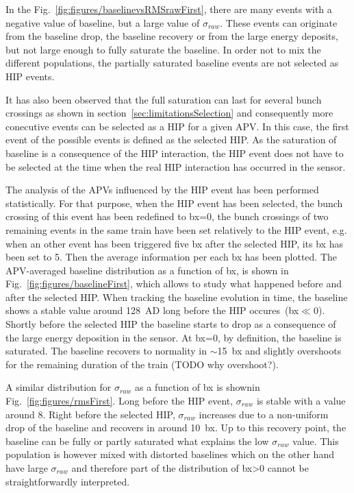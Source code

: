 In the Fig.~\ref{fig:figures/baselinevsRMSrawFirst}, there are many events with a negative value of baseline, but a large value of $\sigma_{raw}$. These events can originate from the baseline drop, the baseline recovery or from the large energy deposits, but not large enough to fully saturate the baseline. In order not to mix the different populations, the partially saturated baseline events are not selected as HIP events. 

It has also been observed that the full saturation can last for several bunch crossings as shown in section~\ref{sec:limitationsSelection} and consequently more conecutive events can be selected as a HIP for a given APV. In this case, the first event of the possible events is defined as the selected HIP. As the saturation of baseline is a consequence of the HIP interaction, the HIP event does not have to be selected at the time when the real HIP interaction has occurred in the sensor. 


The analysis of the APVs influenced by the HIP event has been performed statistically. For that purpose, when the HIP event has been selected, the bunch crossing of this event has been redefined to bx=0, the bunch crossings of two remaining events in the same train have been set relatively to the HIP event, e.g. when an other event has been triggered five bx after the selected HIP, its bx has been set to 5. Then the average information per each bx has been plotted. The APV-averaged baseline distribution as a function of bx, is shown in Fig.~\ref{fig:figures/baselineFirst}, which allows to study what happened before and after the selected HIP. When tracking the baseline evolution in time, the baseline shows a stable value around 128~AD long before the HIP occures~(bx$\ll$0). Shortly before the selected HIP the baseline starts to drop as a consequence of the large energy deposition in the sensor. At bx=0, by definition, the baseline is saturated. The baseline recovers to normality in $\sim$15~bx and slightly overshoots for the remaining duration of the train (TODO why overshoot?).

A similar distribution for $\sigma_{raw}$  as a function of bx is shownin Fig.~\ref{fig:figures/rmsFirst}. Long before the HIP event, $\sigma_{raw}$ is stable with a value around 8. Right before the selected HIP, $\sigma_{raw}$ increases due to a non-uniform drop of the baseline and recovers in around 10~bx. Up to this recovery point, the baseline can be fully or partly saturated what explains the low $\sigma_{raw}$ value. This population is however mixed with distorted baselines which on the other hand have large $\sigma_{raw}$ and therefore part of the distribution of bx>0 cannot be straightforwardly interpreted.

